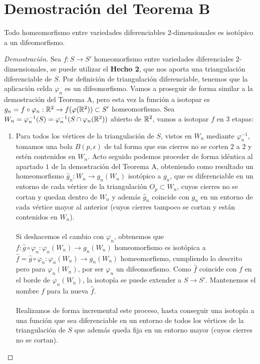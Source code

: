 \section{Demostración del Teorema B}
	\begin{teorb}
		Todo homeomorfismo entre variedades diferenciables 2-dimensionales es isotópico a un difeomorfismo.
	\end{teorb}
	\begin{proof}[Demostración]
		Sea $f: S \rightarrow S'$ homeomorfismo entre variedades diferenciales 2-dimensionales, se puede utilizar el \textbf{Hecho 2}, que nos aporta una triangulación diferenciable de $S$. Por definición de triangulación diferenciable, tenemos que la aplicación celda $\varphi_n$ es un difeomorfismo. Vamos a proseguir de forma similar a la demostración del Teorema A, pero esta vez la función a isotopar es $g_n = f \circ \varphi_n : \mathbb{R}^2 \rightarrow f(\varphi(\mathbb{R}^2)) \subset S'$ homeomorfismo. Sea $W_n = \varphi_n^{-1}(S) = \varphi_n^{-1}(S \cap \varphi_n(\mathbb{R}^2))$ abierto de $\mathbb{R}^2$, vamos a isotopar $f$ en $3$ etapas:
		\begin{enumerate}
			\item Para todos los vértices de la triangulación de $S$, vistos en $W_n$ mediante $\varphi_n^{-1}$, tomamos una bola $B(p, \epsilon)$ de tal forma que sus cierres no se corten $2$ a $2$ y estén contenidos en $W_n$. Acto seguido podemos proceder de forma idéntica al apartado $1$ de la demostración del Teorema A, obteniendo como resultado un homeomorfismo $\widehat{g}_n : W_n \rightarrow g_n(W_n)$ isotópico a $g_n$, que es diferenciable en un entorno de cada vértice de la triangulación $O_p \subset W_n$, cuyos cierres no se cortan y quedan dentro de $W_n$ y además $\widehat{g}_n$ coincide con $g_n$ en un entorno de cada vértice mayor al anterior (cuyos cierres tampoco se cortan y están contenidos en $W_n$). \\
			\\ Si deshacemos el cambio con $\varphi_n$, obtenemos que $f: \widehat{g} \circ \varphi_n : \varphi_n(W_n) \rightarrow g_n(W_n)$ homeomorfismo es isotópica a $\widehat{f} = \widehat{g} \circ \varphi_n : \varphi_n(W_n) \rightarrow g_n(W_n)$ homeomorfismo, cumpliendo lo descrito pero para $\varphi_n(W_n)$, por ser $\varphi_n$ un difeomorfismo. Como $\widehat{f}$ coincide con $f$ en el borde de $\varphi_n(W_n)$, la isotopía se puede extender a $S \rightarrow S'$. Mantenemos el nombre $f$ para la nueva $\widehat{f}$. \\
			\\ Realizamos de forma incremental este proceso, hasta conseguir una isotopía a una función que sea diferenciable en un entorno de todos los vértices de la triangulación de $S$ que además queda fija en un entorno mayor (cuyos cierres no se cortan).

\end{enumerate}
\end{proof}
